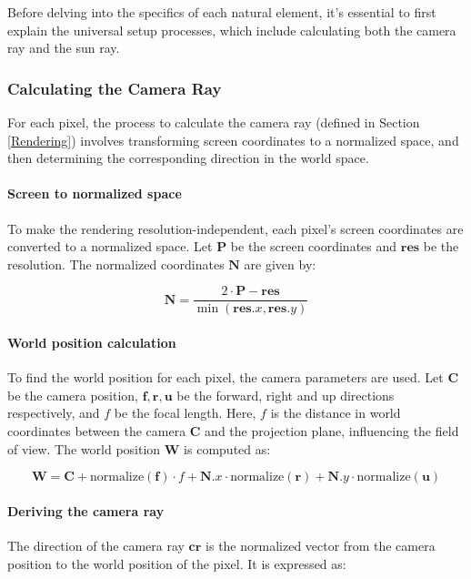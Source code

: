 Before delving into the specifics of each natural element, it’s essential to first explain the universal setup processes, which include calculating both the camera ray and the sun ray.

\subsubsection{Calculating the Camera Ray}

For each pixel, the process to calculate the camera ray (defined in Section \ref{Rendering}) involves transforming screen coordinates to a normalized space, and then determining the corresponding direction in the world space.

\paragraph{Screen to normalized space}
To make the rendering resolution-independent, each pixel's screen coordinates are converted to a normalized space. Let $\mathbf{P}$ be the screen coordinates and $\mathbf{res}$ be the resolution. The normalized coordinates $\mathbf{N}$ are given by:

\begin{equation}
   \mathbf{N} = \frac{2 \cdot \mathbf{P} - \mathbf{res}}{\min(\mathbf{res}.x, \mathbf{res}.y)}
\end{equation}

\paragraph{World position calculation}
To find the world position for each pixel, the camera parameters are used. Let $\mathbf{C}$ be the camera position, $\mathbf{f}, \mathbf{r}, \mathbf{u}$ be the forward, right and up directions respectively, and $f$ be the focal length. Here, $f$ is the distance in world coordinates between the camera $\mathbf{C}$ and the projection plane, influencing the field of view. The world position $\mathbf{W}$ is computed as:

\begin{equation}
   \mathbf{W} = \mathbf{C} + \text{normalize}(\mathbf{f}) \cdot f + \mathbf{N}.x \cdot \text{normalize}(\mathbf{r}) + \mathbf{N}.y \cdot \text{normalize}(\mathbf{u})
\end{equation}

\paragraph{Deriving the camera ray}
The direction of the camera ray $\mathbf{cr}$ is the normalized vector from the camera position to the world position of the pixel. It is expressed as:

